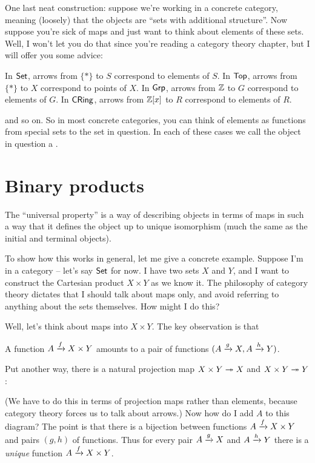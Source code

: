 One last neat construction: suppose we're working in a concrete category,
meaning (loosely) that the objects are ``sets with additional structure''.
Now suppose you're sick of maps and just want to think about elements of these sets.
Well, I won't let you do that since you're reading a category theory chapter,
but I will offer you some advice:
\begin{itemize}
	\ii In $\mathsf{Set}$, arrows from $\{\ast\}$ to $S$ correspond to elements of $S$.
	\ii In $\mathsf{Top}$, arrows from $\{\ast\}$ to $X$ correspond to points of $X$.
	\ii In $\mathsf{Grp}$, arrows from $\mathbb Z$ to $G$ correspond to elements of $G$.
	\ii In $\mathsf{CRing}$, arrows from $\mathbb Z[x]$ to $R$ correspond to elements of $R$.
\end{itemize}
and so on.
So in most concrete categories, you can think of elements as functions from special sets to the set in question.
In each of these cases we call the object in question a .

\section{Binary products}
The ``universal property'' is a way of describing objects in terms of maps
in such a way that it defines the object up to unique isomorphism
(much the same as the initial and terminal objects).

To show how this works in general, let me give a concrete example.
Suppose I'm in a category -- let's say $\mathsf{Set}$ for now.
I have two sets $X$ and $Y$, and I want to construct the Cartesian product $X \times Y$ as we know it.
The philosophy of category theory dictates that I should talk about maps only,
and avoid referring to anything about the sets themselves.
How might I do this?

Well, let's think about maps into $X \times Y$.
The key observation is that
\begin{moral}
A function $A \xrightarrow{f} X \times Y$
amounts to a pair of functions $(A \xrightarrow{g} X, A \xrightarrow{h} Y)$.
\end{moral}
Put another way, there is a natural projection map $X \times Y \twoheadrightarrow X$ and $X \times Y \twoheadrightarrow Y$:
\begin{center}
\end{center}
(We have to do this in terms of projection maps rather than elements,
because category theory forces us to talk about arrows.)
Now how do I add $A$ to this diagram?
The point is that there is a bijection between functions $A \xrightarrow{f} X \times Y$
and pairs $(g,h)$ of functions.
Thus for every pair $A \xrightarrow{g} X$ and $A \xrightarrow{h} Y$ there is a \emph{unique} function
$A \xrightarrow{f} X \times Y$.

